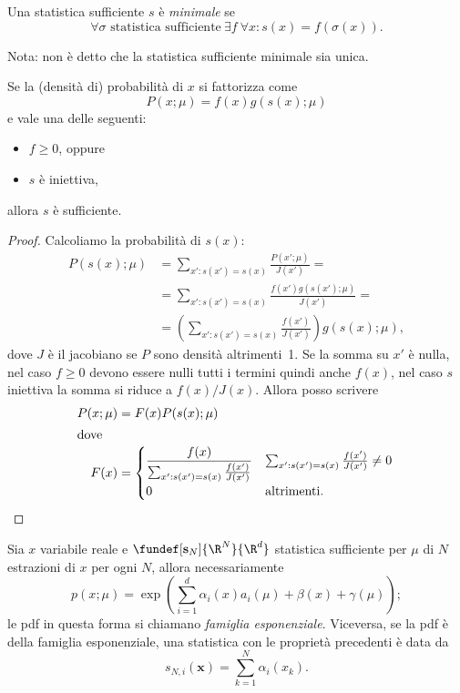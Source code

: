 \begin{definition}
	Una statistica sufficiente $s$ è \emph{minimale} se
	\begin{equation*}
		\forall \sigma \text{ statistica sufficiente}\ \exists f\ \forall x:
		s(x) = f(\sigma(x)).
	\end{equation*}
\end{definition}
Nota: non è detto che la statistica sufficiente minimale sia unica.

\begin{theorem}
	\label{th:suffatt}
	Se la (densità di) probabilità di $x$ si fattorizza come
	\begin{equation*}
		P(x;\mu) = f(x) g(s(x);\mu)
	\end{equation*}
	e vale una delle seguenti:
	\begin{itemize}
		\item $f \ge 0$, oppure
		\item $s$ è iniettiva,
	\end{itemize}
	allora $s$ è sufficiente.
\end{theorem}

\begin{proof}
	Calcoliamo la probabilità di $s(x)$:
	\begin{align*}
		P(s(x);\mu)
		&= \sum_{x':s(x')=s(x)} \frac{P(x';\mu)}{J(x')} = \\
		&= \sum_{x':s(x')=s(x)} \frac{f(x') g(s(x');\mu)}{J(x')} = \\
		&= \left( \sum_{x':s(x')=s(x)} \frac{f(x')}{J(x')} \right) g(s(x);\mu),
	\end{align*}
	dove $J$ è il jacobiano se $P$ sono densità altrimenti~1.
	Se la somma su $x'$ è nulla,
	nel caso $f\ge 0$ devono essere nulli tutti i termini quindi anche $f(x)$,
	nel caso $s$ iniettiva la somma si riduce a $f(x)/J(x)$.
	Allora posso scrivere
	\begin{align*}
		P(x;\mu)
		&= F(x) P(s(x);\mu) \\
		\intertext{dove}
		F(x)
		&= \begin{cases}
			\displaystyle\frac{f(x)}{\sum_{x':s(x')=s(x)} \frac{f(x')}{J(x')}} & \sum_{x':s(x')=s(x)} \frac{f(x')}{J(x')} \neq 0 \\
			0 & \text{altrimenti.}
		\end{cases} \qedhere
	\end{align*}
\end{proof}

\begin{fact}
	Sia $x$ variabile reale e $\fundef[\mathbf s_N]{\R^N}{\R^d}$ statistica sufficiente per $\mu$ di $N$ estrazioni di $x$ per ogni $N$,
	allora necessariamente
	\begin{equation*}
		p(x;\mu) =
		\exp \left( \sum_{i=1}^d \alpha_i(x)a_i(\mu) + \beta(x) + \gamma(\mu) \right);
	\end{equation*}
	le pdf in questa forma si chiamano \emph{famiglia esponenziale}.
	Viceversa, se la pdf è della famiglia esponenziale, una statistica con le proprietà precedenti è data da
	\begin{equation*}
		s_{N,i}(\mathbf x) = \sum_{k=1}^{N} \alpha_i(x_k).
	\end{equation*}
\end{fact}

